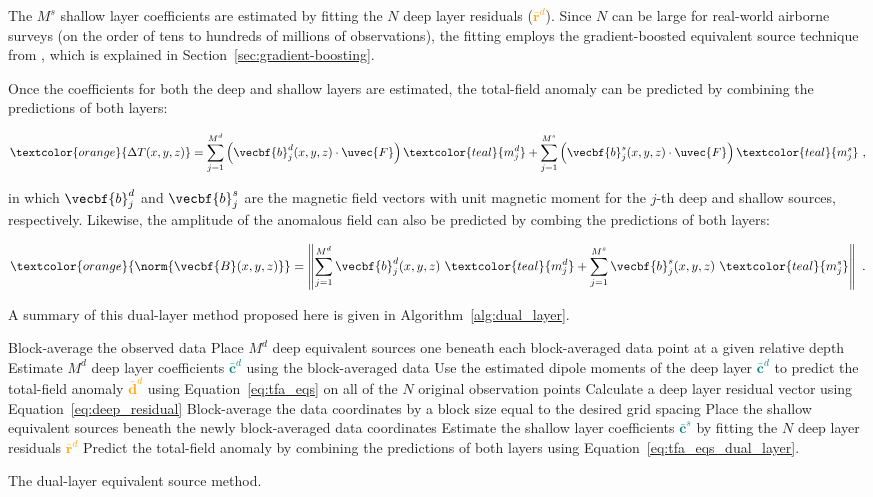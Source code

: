 The $M^s$ shallow layer coefficients are estimated by fitting the $N$ deep layer residuals (\textcolor{orange}{$\bar{\mathbf{r}}^d$}). Since $N$ can be large for real-world airborne surveys (on the order of tens to hundreds of millions of observations), the fitting employs the gradient-boosted equivalent source technique from \citet{Soler2021}, which is explained in Section~\ref{sec:gradient-boosting}. 

Once the coefficients for both the deep and shallow layers are estimated, the total-field anomaly can be predicted by combining the predictions of both layers:

\begin{equation}
    \label{eq:tfa_eqs_dual_layer}
    \textcolor{orange}{\Delta T (x, y, z)} = 
    \sum_{j=1}^{M^d} \left(
        \vecbf{b}^d_j(x, y, z) \cdot \uvec{F}
    \right) \textcolor{teal}{m_j^d}
    + \sum_{j=1}^{M^s} \left(
        \vecbf{b}^s_j(x, y, z) \cdot \uvec{F}
    \right) \textcolor{teal}{m_j^s}
  \ ,
\end{equation}

\noindent
in which $\vecbf{b}_j^d$ and $\vecbf{b}_j^s$ are the magnetic field vectors with unit magnetic moment for the $j$-th deep and shallow sources, respectively. Likewise, the amplitude of the anomalous field can also be predicted by combing the predictions of both layers:

\begin{equation}
  \textcolor{orange}{\norm{\vecbf{B}(x,y,z)}} =
  \left\lVert \sum_{j=1}^{M^d} \vecbf{b}^d_{j}(x,y,z)\ \textcolor{teal}{m^d_j}
  +
  \sum_{j=1}^{M^s}  \vecbf{b}^s_{j}(x,y,z)\ \textcolor{teal}{m^s_j}
  \right\rVert
  \ .
\end{equation}

\noindent
A summary of this dual-layer method proposed here is given in Algorithm~\ref{alg:dual_layer}.

\begin{algorithm}[!htb]
  Block-average the observed data
  \;
  Place $M^d$ deep equivalent sources one beneath each block-averaged data point at a given relative depth
  \;
  Estimate $M^d$ deep layer coefficients \textcolor{teal}{$\bar{\mathbf{c}}^d$} using the block-averaged data
  \;
  Use the estimated dipole moments of the deep layer \textcolor{teal}{$\bar{\mathbf{c}}^d$} to predict the total-field anomaly \textcolor{orange}{$\bar{\mathbf{d}}^d$} using Equation~\ref{eq:tfa_eqs} on all of the $N$ original observation points
  \;
  Calculate a deep layer residual vector using Equation~\ref{eq:deep_residual}
  \;
  Block-average the data coordinates by a block size equal to the desired grid spacing
  \;
  Place the shallow equivalent sources beneath the newly block-averaged data coordinates
  \;
  Estimate the shallow layer coefficients \textcolor{teal}{$\bar{\mathbf{c}}^s$} by fitting the $N$ deep layer residuals \textcolor{orange}{$\bar{\mathbf{r}}^d$}
  \;
   Predict the total-field anomaly by combining the predictions of both layers using Equation~\ref{eq:tfa_eqs_dual_layer}.
  \BlankLine
  \caption{The dual-layer equivalent source method.}
  \label{alg:dual_layer}
\end{algorithm}


